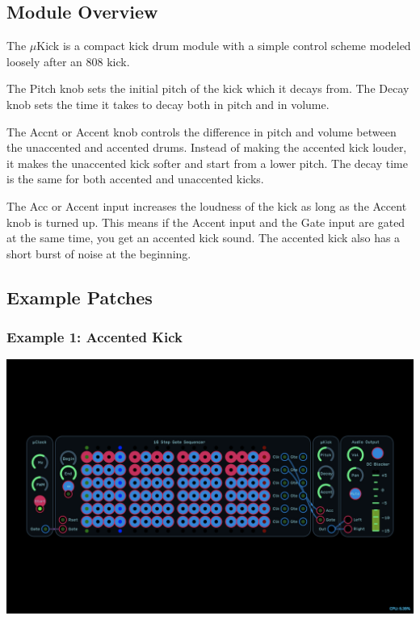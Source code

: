 \documentclass[11pt]{book}
\begin{document}
\pagebreak

\begin{multicols*}{2}

\subsection*{Module Overview}

The $\mu$Kick is a compact kick drum module with a simple control scheme modeled loosely after an 808 kick. 

The Pitch knob sets the initial pitch of the kick which it decays from. The Decay knob sets the time it takes to decay both in pitch and in volume. 

The Accnt or Accent knob controls the difference in pitch and volume between the unaccented and accented drums. Instead of making the accented kick louder, it makes the unaccented kick softer and start from a lower pitch. The decay time is the same for both accented and unaccented kicks.

The Acc or Accent input increases the loudness of the kick as long as the Accent knob is turned up. This means if the Accent input and the Gate input are gated at the same time, you get an accented kick sound. The accented kick also has a short burst of noise at the beginning.

\subsection*{Example Patches}

\subsubsection*{Example 1: Accented Kick}

\begin{center}
\includegraphics[width=0.95\linewidth]{ukick-fig1.png}
\end{center}


\end{multicols*}
\end{document}
